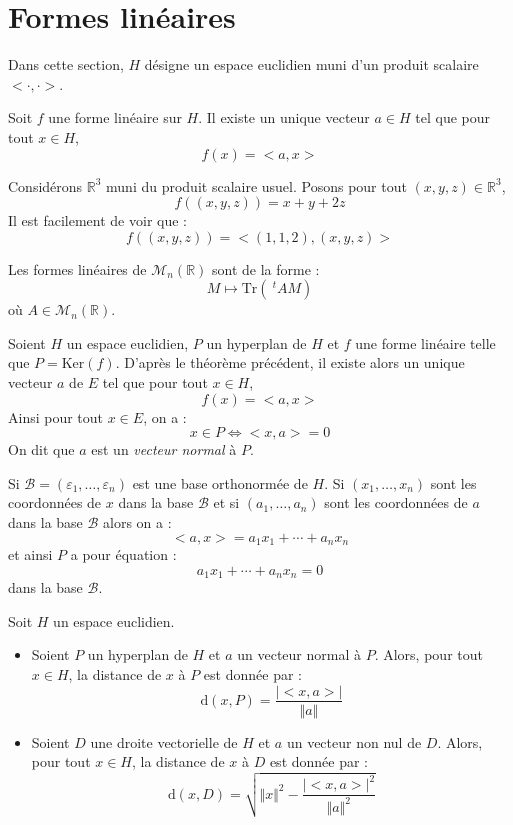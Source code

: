 \documentclass[a4paper,10pt]{report}
\begin{document}
\section{Formes linéaires}
\noindent Dans cette section, $H$ désigne un espace euclidien muni d'un produit scalaire $< \cdot, \cdot>$.

\begin{thm} Soit $f$ une forme linéaire sur $H$. Il existe un unique vecteur $a \in H$ tel que pour tout $x \in H$,
$$ f(x)= <a,x>$$
\end{thm}

\begin{preuve}
\vspace{4cm}
\end{preuve}

\begin{exems}
\item Considérons $\mathbb{R}^3$ muni du produit scalaire usuel. Posons pour tout $(x,y,z) \in \mathbb{R}^3$,
$$ f((x,y,z)) = x+y+2z $$
Il est facilement de voir que :
$$ f((x,y,z)) = <(1,1,2), (x,y,z)>$$
\item Les formes linéaires de $\mathcal{M}_n(\mathbb{R})$ sont de la forme :
$$ M \mapsto \textrm{Tr}(~^tA M) $$
où $A \in \mathcal{M}_n(\mathbb{R})$.
\end{exems}

\begin{defin} Soient $H$ un espace euclidien, $P$ un hyperplan de $H$ et $f$ une forme linéaire telle que $P = \textrm{Ker}(f)$. D'après le théorème précédent, il existe alors un unique vecteur $a$ de $E$ tel que pour tout $x \in H$, 
$$ f(x) = <a,x>$$
Ainsi pour tout $x \in E$, on a :
$$ x \in P \Longleftrightarrow <x,a>= 0$$
On dit que $a$ est un \textit{vecteur normal} à $P$.

\noindent Si $\mathcal{B}=(\varepsilon_1, \ldots, \varepsilon_n)$ est une base orthonormée de $H$. Si $(x_1, \ldots, x_n)$ sont les coordonnées de $x$ dans la base $\mathcal{B}$ et si $(a_1, \ldots, a_n)$ sont les coordonnées de $a$ dans la base $\mathcal{B}$ alors on a :
$$ <a,x> = a_1 x_1 + \cdots + a_n x_n $$
et ainsi $P$ a pour équation :
$$ a_1 x_1 + \cdots + a_n x_n = 0$$
dans la base $\mathcal{B}$. 
\end{defin}

\begin{prop}
Soit $H$ un espace euclidien.
\begin{itemize}
\item Soient $P$ un hyperplan de $H$ et $a$ un vecteur normal à $P$. Alors, pour tout $x \in H$, la distance de $x$ à $P$ est donnée par :
$$ \textrm{d}(x,P) = \dfrac{\vert <x,a> \vert}{\Vert a \Vert}$$
\item Soient $D$ une droite vectorielle de $H$ et $a$ un vecteur non nul de $D$. Alors, pour tout $x \in H$, la distance de $x$ à $D$ est donnée par :
$$ \textrm{d}(x,D) = \sqrt{\Vert x \Vert^2 -  \dfrac{\vert <x,a> \vert^2}{\Vert a \Vert^2}} $$
\end{itemize}
\end{prop}
\end{document}
